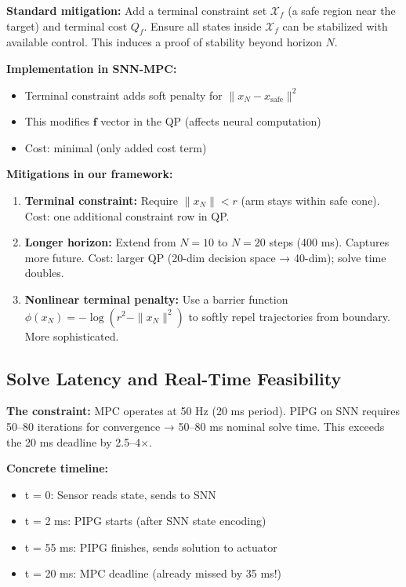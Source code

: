 \textbf{Standard mitigation:} Add a terminal constraint set $\mathcal{X}_f$ (a safe region near the target) and terminal cost $Q_f$. Ensure all states inside $\mathcal{X}_f$ can be stabilized with available control. This induces a proof of stability beyond horizon $N$.

\textbf{Implementation in SNN-MPC:}
\begin{itemize}
\item Terminal constraint adds soft penalty for $\|x_N - x_{\text{safe}}\|^2$
\item This modifies $\mathbf{f}$ vector in the QP (affects neural computation)
\item Cost: minimal (only added cost term)
\end{itemize}

\textbf{Mitigations in our framework:}
\begin{enumerate}
\item \textbf{Terminal constraint:} Require $\|x_N\| < r$ (arm stays within safe cone). Cost: one additional constraint row in QP.

\item \textbf{Longer horizon:} Extend from $N=10$ to $N=20$ steps (400 ms). Captures more future. Cost: larger QP (20-dim decision space → 40-dim); solve time doubles.

\item \textbf{Nonlinear terminal penalty:} Use a barrier function $\phi(x_N) = -\log(r^2 - \|x_N\|^2)$ to softly repel trajectories from boundary. More sophisticated.
\end{enumerate}

\subsection{Solve Latency and Real-Time Feasibility}

\textbf{The constraint:} MPC operates at 50 Hz (20 ms period). PIPG on SNN requires 50--80 iterations for convergence → 50--80 ms nominal solve time. This exceeds the 20 ms deadline by 2.5--4×.

\textbf{Concrete timeline:}
\begin{itemize}
\item t = 0: Sensor reads state, sends to SNN
\item t = 2 ms: PIPG starts (after SNN state encoding)
\item t = 55 ms: PIPG finishes, sends solution to actuator
\item t = 20 ms: MPC deadline (already missed by 35 ms!)
\end{itemize}


